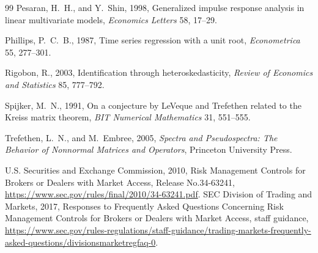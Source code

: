 \documentclass[12pt]{article}
\theoremstyle{definition}
\theoremstyle{remark}
\begin{document}
\begin{thebibliography}{99}
Pesaran, H.~H., and Y.~Shin, 1998, Generalized impulse response analysis in linear multivariate models, \emph{Economics Letters} 58, 17--29.

Phillips, P.~C.~B., 1987, Time series regression with a unit root, \emph{Econometrica} 55, 277--301.

Rigobon, R., 2003, Identification through heteroskedasticity, \emph{Review of Economics and Statistics} 85, 777--792.

Spijker, M.~N., 1991, On a conjecture by LeVeque and Trefethen related to the Kreiss matrix theorem, \emph{BIT Numerical Mathematics} 31, 551--555.

Trefethen, L.~N., and M.~Embree, 2005, \emph{Spectra and Pseudospectra: The Behavior of Nonnormal Matrices and Operators}, Princeton University Press.


U.S. Securities and Exchange Commission, 2010, Risk Management Controls for Brokers or Dealers with Market Access, Release No.34-63241, \url{https://www.sec.gov/rules/final/2010/34-63241.pdf}.
SEC Division of Trading and Markets, 2017, Responses to Frequently Asked Questions Concerning Risk Management Controls for Brokers or Dealers with Market Access, staff guidance, \url{https://www.sec.gov/rules-regulations/staff-guidance/trading-markets-frequently-asked-questions/divisionsmarketregfaq-0}.

\end{thebibliography}
\end{document}
